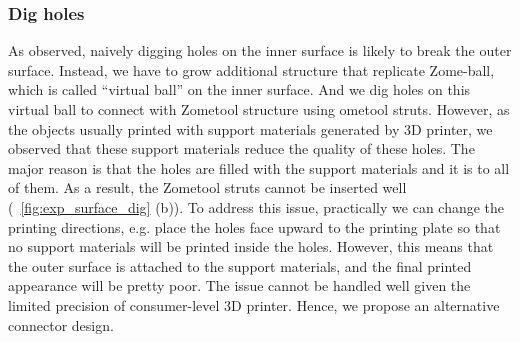 \subsubsection{Dig holes}
As observed, naively digging holes on the inner surface is likely to break the outer surface.
Instead, we have to grow additional structure that replicate Zome-ball, which is called ``virtual ball'' on the inner surface.
And we dig holes on this virtual ball to connect with  Zometool structure using ometool struts.
However, as the objects usually printed with support materials generated by 3D printer, we observed that these support materials  reduce the quality of these holes.
The major reason is that the holes are filled with the support materials and it is  to  all of them.
As a result, the Zometool struts cannot be inserted well (\figname~\ref{fig:exp_surface_dig} (b)).
To address this issue, practically we can change the printing directions, e.g.\chinky{,} place the holes face upward to the printing plate so that no support materials will be printed inside the holes.
However, this means that the outer surface is attached to the support materials, and the final printed appearance will be pretty poor.
The issue cannot be handled well given the limited precision of consumer-level 3D printer.
Hence, we propose an alternative connector design.
    
